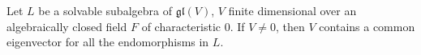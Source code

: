 Let $L$ be a solvable subalgebra of $\mathfrak{gl}(V)$, $V$ finite dimensional over an algebraically closed field $F$ of characteristic 0. If $V \neq 0$, then $V$ contains a common eigenvector for all the endomorphisms in $L$.
